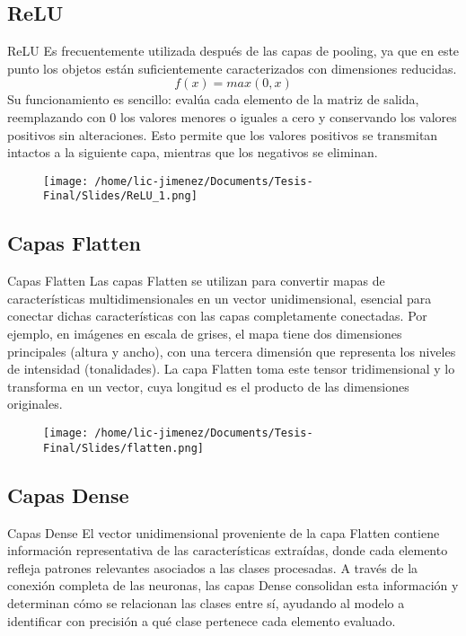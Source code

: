 \documentclass{beamer}
\begin{document}
\subsection{ReLU}
\begin{frame}{ReLU}
    Es frecuentemente utilizada después de las capas de pooling, ya que en este punto los objetos están suficientemente caracterizados con dimensiones reducidas. 
    \[ f(x) = max (0, x) \]
    Su funcionamiento es sencillo: evalúa cada elemento de la matriz de salida, reemplazando con 0 los valores menores o iguales a cero y conservando los valores positivos sin alteraciones. Esto permite que los valores positivos se transmitan intactos a la siguiente capa, mientras que los negativos se eliminan.    
    \begin{figure}
        \centering
        \texttt{[image: /home/lic-jimenez/Documents/Tesis-Final/Slides/ReLU\_1.png]}
    \end{figure}
\end{frame}


\subsection{Capas Flatten}
\begin{frame}{Capas Flatten}
Las capas Flatten se utilizan para convertir mapas de características multidimensionales en un vector unidimensional, esencial para conectar dichas características con las capas completamente conectadas. Por ejemplo, en imágenes en escala de grises, el mapa tiene dos dimensiones principales (altura y ancho), con una tercera dimensión que representa los niveles de intensidad (tonalidades). La capa Flatten toma este tensor tridimensional y lo transforma en un vector, cuya longitud es el producto de las dimensiones originales.
    \begin{figure}
        \centering
        \texttt{[image: /home/lic-jimenez/Documents/Tesis-Final/Slides/flatten.png]}
    \end{figure}
\end{frame}


\subsection{Capas Dense}
\begin{frame}{Capas Dense}
    El vector unidimensional proveniente de la capa Flatten contiene información representativa de las características extraídas, donde cada elemento refleja patrones relevantes asociados a las clases procesadas. A través de la conexión completa de las neuronas, las capas Dense consolidan esta información y determinan cómo se relacionan las clases entre sí, ayudando al modelo a identificar con precisión a qué clase pertenece cada elemento evaluado.
\end{frame}
\end{document}
